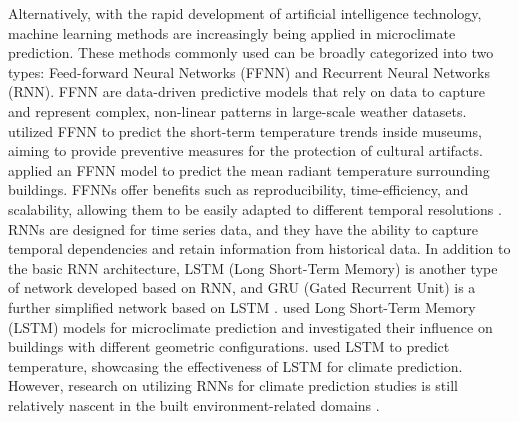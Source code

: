\documentclass[a4paper,fleqn]{cas-sc}
\begin{document}
Alternatively, with the rapid development of artificial intelligence technology, machine learning methods are increasingly being applied in microclimate prediction. These methods commonly used can be broadly categorized into two types: Feed-forward Neural Networks (FFNN) and Recurrent Neural Networks (RNN). FFNN are data-driven predictive models that rely on data to capture and represent complex, non-linear patterns in large-scale weather datasets. \citet{bile2022novel} utilized FFNN to predict the short-term temperature trends inside museums, aiming to provide preventive measures for the protection of cultural artifacts. \cite{xie2022backpropagation} applied an FFNN model to predict the mean radiant temperature surrounding buildings. FFNNs offer benefits such as reproducibility, time-efficiency, and scalability, allowing them to be easily adapted to different temporal resolutions \citep{mocanu2018scalable}. RNNs are designed for time series data, and they have the ability to capture temporal dependencies and retain information from historical data. In addition to the basic RNN architecture, LSTM (Long Short-Term Memory) is another type of network developed based on RNN, and GRU (Gated Recurrent Unit) is a further simplified network based on LSTM \citep{zargar2021introduction}. \citet{zhang2021urban} used Long Short-Term Memory (LSTM) models for microclimate prediction and investigated their influence on buildings with different geometric configurations. \cite{koc2021investigation} used LSTM to predict temperature, showcasing the effectiveness of LSTM for climate prediction. However, research on utilizing RNNs for climate prediction studies is still relatively nascent in the built environment-related domains \citep{han2021using}.


\end{document}

